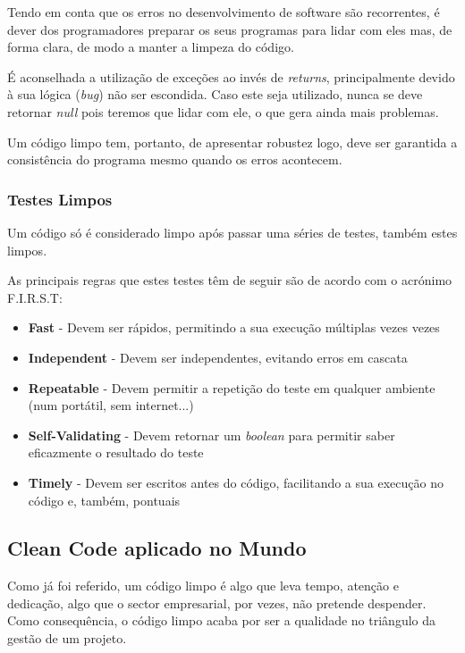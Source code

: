 \documentclass[10pt,portuguese]{article}
\begin{document}
\Par Tendo em conta que os erros no desenvolvimento de software são recorrentes, é dever dos programadores preparar os seus programas para lidar com eles mas, de forma clara, de modo a manter a limpeza do código.

\Par É aconselhada a utilização de exceções ao invés de \textit{returns}, principalmente devido à sua lógica (\textit{bug}) não ser escondida. Caso este seja utilizado, nunca se deve retornar \textit{null} pois teremos que lidar com ele, o que gera ainda mais problemas. 

\par Um código limpo tem, portanto, de apresentar robustez logo, deve ser garantida a consistência do programa mesmo quando os erros acontecem.

\subsubsection{Testes Limpos}

\Par Um código só é considerado limpo após passar uma séries de testes, também estes limpos.

\Par As principais regras que estes testes têm de seguir são de acordo com o acrónimo F.I.R.S.T:

\begin{itemize}
    \item \textbf{Fast} - Devem ser rápidos, permitindo a sua execução múltiplas vezes vezes
    \item \textbf{Independent} - Devem ser independentes, evitando erros em cascata
    \item \textbf{Repeatable} - Devem permitir a repetição do teste em qualquer ambiente (num portátil, sem internet...)
    \item \textbf{Self-Validating} - Devem retornar um \textit{boolean} para permitir saber eficazmente o resultado do teste
    \item \textbf{Timely} - Devem ser escritos antes do código, facilitando a sua execução no código e, também, pontuais
\end{itemize}

\clearpage

\subsection{Clean Code aplicado no Mundo}

\Par Como já foi referido, um código limpo é algo que leva tempo, atenção e dedicação, algo que o sector empresarial, por vezes, não pretende despender. Como consequência, o código limpo acaba por ser a qualidade no triângulo da gestão de um projeto.
\end{document}
